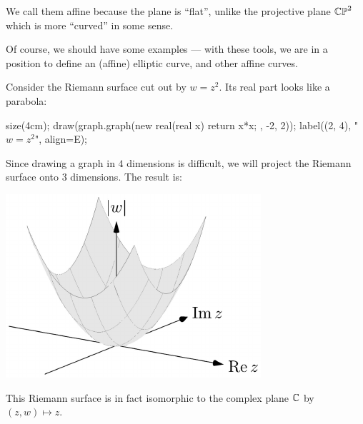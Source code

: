 We call them affine because the plane is ``flat'', unlike the projective plane $\mathbb{CP}^2$ which is
more ``curved'' in some sense.

Of course, we should have some examples --- with these tools, we are in a position to define an
(affine) elliptic curve, and other affine curves.

\begin{example}[A parabola]
	Consider the Riemann surface cut out by $w = z^2$.
	Its real part looks like a parabola:
	\begin{center}
		\begin{asy}
			size(4cm);
			draw(graph.graph(new real(real x){ return x*x; }, -2, 2));
			label((2, 4), "$w=z^2$", align=E);
		\end{asy}
	\end{center}
	Since drawing a graph in $4$ dimensions is difficult, we will project the Riemann surface onto
	$3$ dimensions.
	The result is:
	\begin{center}
		\includegraphics{3dfigures/pdf/parabola.pdf}
	\end{center}

	This Riemann surface is in fact isomorphic to the complex plane $\mathbb C$ by $(z, w) \mapsto z$.
\end{example}

